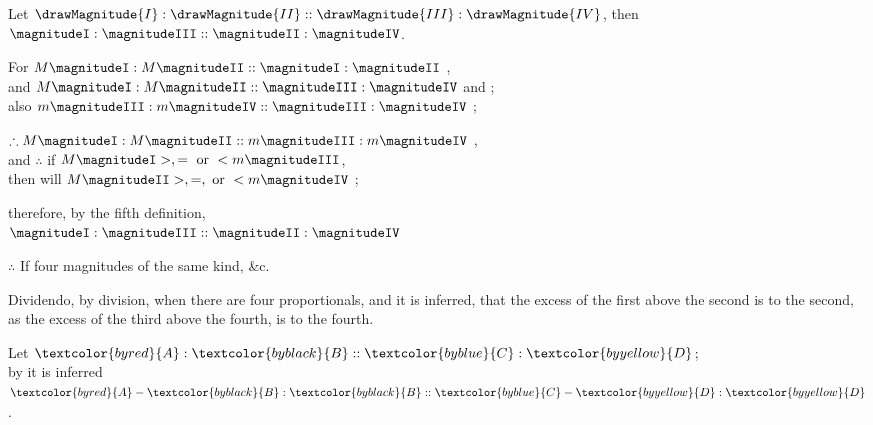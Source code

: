 \documentclass{byrne-book}
\begin{document}
\vfill\pagebreak

\label{prop:V.XVI}

\begin{center}
Let $\drawMagnitude{I} : \drawMagnitude{II} :: \drawMagnitude{III} : \drawMagnitude{IV}$, then $\magnitudeI : \magnitudeIII :: \magnitudeII : \magnitudeIV$.

For $M \magnitudeI : M \magnitudeII :: \magnitudeI : \magnitudeII$ ,\\
and $M \magnitudeI : M \magnitudeII :: \magnitudeIII : \magnitudeIV$ \bycref{\hypref} and ;\\
also $m \magnitudeIII : m \magnitudeIV :: \magnitudeIII : \magnitudeIV$ ;

$\therefore M \magnitudeI : M \magnitudeII :: m \magnitudeIII : m \magnitudeIV$ ,\\
and $\therefore$ if $M \magnitudeI >, = \mbox { or } < m \magnitudeIII$,\\
then will $M \magnitudeII >, =, \mbox{ or } < m \magnitudeIV$ ;

therefore, by the fifth definition,\\
 $\magnitudeI : \magnitudeIII :: \magnitudeII : \magnitudeIV$

 $\therefore$ If four magnitudes of the same kind, \&c.
\end{center}


\vfill\pagebreak

\label{def:V.XVI} 
\def\varA{\textcolor{byred}{A}}
\def\varB{\textcolor{byblack}{B}}
\def\varC{\textcolor{byblue}{C}}
\def\varD{\textcolor{byyellow}{D}}
Dividendo, by division, when there are four proportionals, and it is inferred, that the excess of the first above the second is to the second, as the excess of the third above the fourth, is to the fourth.

\begin{center}
Let $\varA : \varB :: \varC : \varD$;\\
by  it is inferred\\
$\varA - \varB : \varB :: \varC - \varD : \varD$. %
\end{center}
\end{document}
